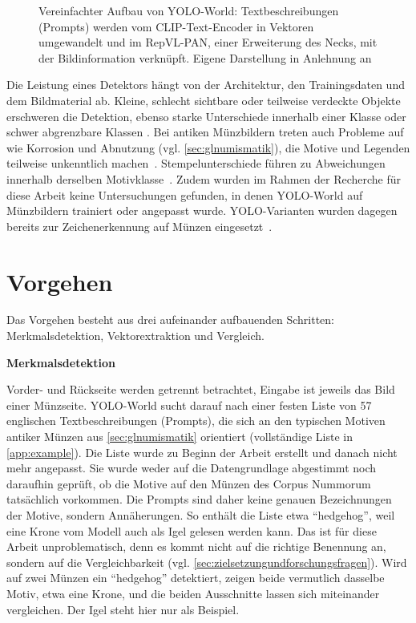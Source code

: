 \begin{figure}[H]
  \centering
  \resizebox{\linewidth}{!}{}
  \caption[Aufbau von YOLO-World]{Vereinfachter Aufbau von YOLO-World: Textbeschreibungen (Prompts) werden vom CLIP-Text-Encoder in Vektoren umgewandelt und im RepVL-PAN, einer Erweiterung des Necks, mit der Bildinformation verknüpft. Eigene Darstellung in Anlehnung an~\cite{cheng2024yoloworld}}
  \label{fig:yolo-world}
\end{figure}

\noindent Die Leistung eines Detektors hängt von der Architektur, den Trainingsdaten und dem Bildmaterial ab. Kleine, schlecht sichtbare oder teilweise verdeckte Objekte erschweren die Detektion, ebenso starke Unterschiede innerhalb einer Klasse oder schwer abgrenzbare Klassen \cite{liu2020deep}. Bei antiken Münzbildern treten auch Probleme auf wie Korrosion und Abnutzung (vgl. \cref{sec:glnumismatik}), die Motive und Legenden teilweise unkenntlich machen~\cite{cooper2020learning,anwar2026reading}.
Stempelunterschiede führen zu Abweichungen innerhalb derselben Motivklasse~\cite{wikipedia-muenzpraegung}. Zudem wurden im Rahmen der Recherche für diese Arbeit keine Untersuchungen gefunden, in denen YOLO-World auf Münzbildern trainiert oder angepasst wurde. YOLO-Varianten wurden dagegen bereits zur Zeichenerkennung auf Münzen eingesetzt~\cite{anwar2026reading}.

\section{Vorgehen}
\label{sec:vorgehen}
Das Vorgehen besteht aus drei aufeinander aufbauenden Schritten: Merkmalsdetektion, Vektorextraktion und Vergleich.

\vspace{\baselineskip}

\noindent \textbf{Merkmalsdetektion}

\noindent Vorder- und Rückseite werden getrennt betrachtet, Eingabe ist jeweils das Bild einer Münzseite. YOLO-World sucht darauf nach einer festen Liste von 57 englischen Textbeschreibungen (Prompts), die sich an den typischen Motiven antiker Münzen aus \cref{sec:glnumismatik} orientiert (vollständige Liste in \cref{app:example}). Die Liste wurde zu Beginn der Arbeit erstellt und danach nicht mehr angepasst. Sie wurde weder auf die Datengrundlage abgestimmt noch daraufhin geprüft, ob die Motive auf den Münzen des Corpus Nummorum tatsächlich vorkommen. Die Prompts sind daher keine genauen Bezeichnungen der Motive, sondern Annäherungen. So enthält die Liste etwa \enquote{hedgehog}, weil eine Krone vom Modell auch als Igel gelesen werden kann. Das ist für diese Arbeit unproblematisch, denn es kommt nicht auf die richtige Benennung an, sondern auf die Vergleichbarkeit (vgl. \cref{sec:zielsetzungundforschungsfragen}). Wird auf zwei Münzen ein \enquote{hedgehog} detektiert, zeigen beide vermutlich dasselbe Motiv, etwa eine Krone, und die beiden Ausschnitte lassen sich miteinander vergleichen. Der Igel steht hier nur als Beispiel.

